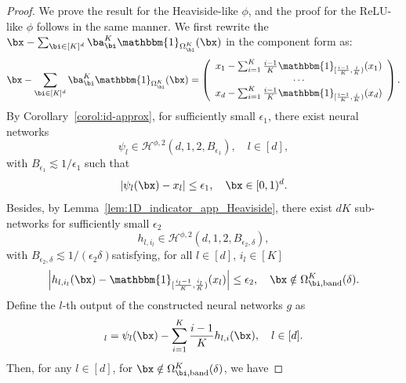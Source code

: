 \documentclass[11pt]{article}
\begin{document}
\begin{proof}
    We prove the result for the Heaviside-like $\phi$, and the proof for the ReLU-like $\phi$ follows in the same manner. We first rewrite the  $\bx - \sum_{\bi \in [K]^d} \ba_{\bi}^K \mathbbm{1}_{\Omega_{\bi}^K} (\bx)$ in the component form as:
    \begin{equation*}
        \bx - \sum_{\bi \in [K]^d} \ba_{\bi}^K \mathbbm{1}_{\Omega_{\bi}^K} (\bx) = \left(
        \begin{array}{c}
            x_1 - \sum_{i=1}^K \frac{i-1}{K} \mathbbm{1}_{[\frac{i-1}{K},\frac{i}{K})} ( x_1)\\
            \cdots \\
            x_d - \sum_{i=1}^K \frac{i-1}{K} \mathbbm{1}_{[\frac{i-1}{K},\frac{i}{K})} ( x_d)
            \end{array}
        \right).
    \end{equation*}
    By Corollary~\ref{corol:id-approx}, for sufficiently small $\epsilon_1$, there exist neural networks
    \begin{equation*}
        \psi_l \in \mathcal{H}^{\phi,2}(d, 1, 2, B_{\epsilon_1}), \quad l \in [d] ,
    \end{equation*}
    with $B_{\epsilon_1} \lesssim 1/\epsilon_1$ such that \begin{equation*}
        |\psi_l(\bx) - x_l| \leq \epsilon_1, \quad \bx \in [0,1)^d.
    \end{equation*}
    Besides, by Lemma~\ref{lem:1D_indicator_app_Heaviside},
    there exist $dK$ sub-networks for sufficiently small $\epsilon_2$
    \begin{equation*}
        h_{l,i_l} \in \mathcal{H}^{\phi,2}\left( d, 1, 2, B_{\epsilon_2, \delta}\right),
    \end{equation*}
    with $B_{\epsilon_2, \delta} \lesssim 1 / (\epsilon_2 \delta) $satisfying, for all $l \in [d]$, $i_l \in [K]$
    \begin{equation*}
        \left| h_{l,i_l}(\bx) - \mathbbm{1}_{[\frac{i_l-1}{K},\frac{i_l}{K})} (x_l)\right| \leq \epsilon_2, \quad \bx \notin \Omega_{\bi, \mathrm{band}}^{K}(\delta). 
    \end{equation*}
    Define the $l$-th output of the constructed neural networks $g$ as 
    \begin{equation*}
        [g(\bx)]_l = \psi_l(\bx) - \sum_{i=1}^K \frac{i-1}{K} h_{l, i }(\bx), \quad l \in [d]. 
    \end{equation*}
    Then, for any $l \in [d]$, for $\bx \notin \Omega_{\bi, \mathrm{band}}^{K}(\delta)$, we have 

\end{proof}
\end{document}
